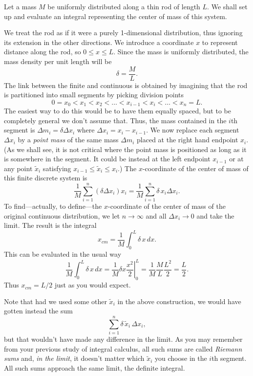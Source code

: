 \nextex
\xdef\ExOne{\en}
  Let a mass $M$ be uniformly distributed
along a thin rod of length $L$.   We shall set up and evaluate
an integral representing the center of mass of this system.
\medskip
\centerline{}
\medskip
We treat the rod as if it were a purely 1-dimensional distribution,
thus ignoring its extension in the other directions.  We introduce
a coordinate $x$ to represent distance along the rod, so
$0 \le x \le L$.    Since
the mass is uniformly distributed, the mass density per
unit length will be
$$
    \delta = \frac ML.
$$
The link between the finite and continuous is obtained by
imagining that the rod is partitioned into small segments
by picking division points
$$
     0 = x_0 < x_1 < x_2 < \dots < x_{i-1} < x_i < \dots < x_n = L.
$$
The easiest way to do this would be to have them equally spaced,
but to be completely general we don't assume that.  Thus, the
mass contained in the $i$th segment is $\Delta m_i = \delta \Delta x_i$
where $\Delta x_i = x_i - x_{i-1}$.  We now replace each segment
$\Delta x_i$ by a {\it point mass\/} of the
same mass $\Delta m_i$ placed at the right hand endpoint
$x_i$.   (As we shall see, it is not critical where the point mass
is positioned as long as it is somewhere in the segment.  It
could be instead at the left endpoint $x_{i-1}$
 or at any point $\tilde x_i$ satisfying $x_{i-1}\le \tilde x_i
\le x_i$.)  The  $x$-coordinate
of the center of mass of this finite discrete system
is
$$
     \frac 1M \sum_{i=1}^n (\delta \Delta x_i)x_i
           =
     \frac 1M \sum_{i=1}^n \delta\, x_i \Delta x_i.
$$
To find---actually, to define---the $x$-coordinate
of the center of mass of the original continuous
distribution, we let $n \to \infty$ and all $\Delta x_i \to 0$
and take the limit.  The result is the integral
$$
     x_{cm} = \frac 1M \int_0^L \delta\, x\, dx.
$$
This can be evaluated in the usual way
$$
     \frac 1M \int_0^L \delta\, x\, dx =\frac 1M \delta x\left.\frac
{x^2}2\right |_0^L = \frac 1M \frac ML \frac{L^2}2 = \frac L2.
$$
Thus $x_{cm} = L/2$ just as you would expect.
\endexample

Note that had we used some other $\tilde x_i$ in the above
construction, we would have gotten instead the
sum
$$\sum_{i=1}^n \delta\, \tilde x_i \, \Delta x_i,
$$
but that wouldn't have made any difference in the limit.
As you may remember from your previous study of integral
calculus, all such sums are called {\it Riemann sums\/}
and, {\it in the limit\/}, it doesn't matter which $\tilde x_i$
you choose in the $i$th segment.  All such sums approach the
same limit, the definite integral.  

